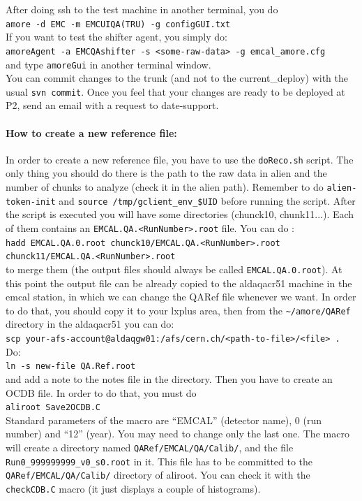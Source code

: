 After doing ssh to the test machine in another terminal, you do \\
\texttt{amore -d EMC -m EMCUIQA(TRU) -g configGUI.txt}\\
If you want to test the shifter agent, you simply do:\\
\texttt{amoreAgent -a EMCQAshifter -s <some-raw-data>  -g emcal\_amore.cfg}\\
and type \texttt{amoreGui} in another terminal window.\\
You can commit changes to the trunk (and not to the current\_deploy) with the usual \texttt{svn commit}. Once you feel that your changes are ready to be deployed at P2, send an email with a request to date-support.



\paragraph{How to create a new reference file:}

In order to create a new reference file, you have to use the \texttt{doReco.sh} script. The only thing you should do there is the path to the raw data in alien and the number of chunks to analyze (check it in the alien path).
Remember to do \texttt{alien-token-init} and \texttt{source /tmp/gclient\_env\_\$UID} before running the script.
After the script is executed you will have some directories (chunck10, chunk11...). Each of them contains an \texttt{EMCAL.QA.<RunNumber>.root} file. You can do :\\
\texttt{hadd EMCAL.QA.0.root chunck10/EMCAL.QA.<RunNumber>.root \newline chunck11/EMCAL.QA.<RunNumber>.root}\\
to merge them (the output files should always be called \texttt{EMCAL.QA.0.root}).
At this point the output file can be already copied to the aldaqacr51 machine in the emcal station, in which we can change the QARef file whenever we want.
In order to do that, you should copy it to your lxplus area, then from the \texttt{\textasciitilde/amore/QARef} directory in the aldaqacr51 you can do:\\
\texttt{scp your-afs-account@aldaqgw01:/afs/cern.ch/<path-to-file>/<file> .}\\
Do:\\
\texttt{ln -s new-file QA.Ref.root}\\
and add a note to the notes file in the directory.
Then you have to create an OCDB file. In order to do that, you must do\\ 
\texttt{aliroot Save2OCDB.C}\\
Standard parameters of the macro are ``EMCAL'' (detector name), 0 (run number) and ``12'' (year). You may need to change only the last one. The macro will create a directory named \texttt{QARef/EMCAL/QA/Calib/}, and the file \texttt{Run0\_999999999\_v0\_s0.root} in it. This file has to be committed to the \texttt{QARef/EMCAL/QA/Calib/} directory of aliroot. You can check it with the \texttt{checkCDB.C} macro (it just displays a couple of histograms).


